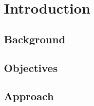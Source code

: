 \chapter{Introduction}
\label{chap:intro}
\section{Background}
\label{sec:background}

\section{Objectives}
\label{sec:objectives}

\section{Approach}
\label{sec:approach}
